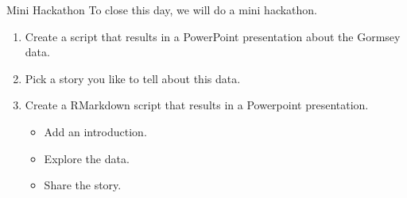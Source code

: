 \documentclass[
  ignorenonframetext,
]{beamer}
\providecommand{\tightlist}{%
  \setlength{\itemsep}{0pt}\setlength{\parskip}{0pt}}
\begin{document}
\begin{frame}{Mini Hackathon}
\protect\hypertarget{mini-hackathon}{}
To close this day, we will do a mini hackathon.

\begin{enumerate}
\tightlist
\item
  Create a script that results in a PowerPoint presentation about the
  Gormsey data.
\item
  Pick a story you like to tell about this data.
\item
  Create a RMarkdown script that results in a Powerpoint presentation.

  \begin{itemize}
  \tightlist
  \item
    Add an introduction.
  \item
    Explore the data.
  \item
    Share the story.
  \end{itemize}
\end{enumerate}
\end{frame}
\end{document}
